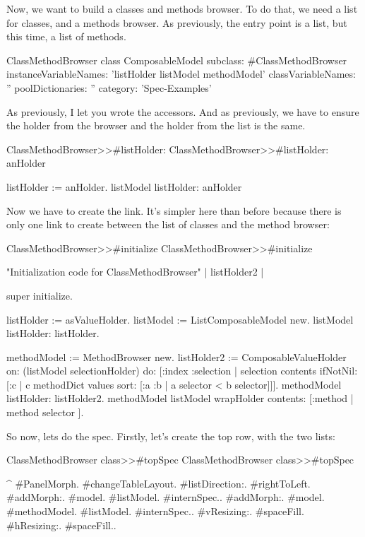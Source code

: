 \documentclass[a4paper,10pt,twoside]{book}
\begin{document}
Now, we want to build a classes and methods browser. To do that, we need a list for classes, and a methods browser. As previously, the entry point is a list, but this time, a list of methods.

\begin{classdef}{ClassMethodBrowser class}
ComposableModel subclass: #ClassMethodBrowser
	instanceVariableNames: 'listHolder listModel methodModel'
	classVariableNames: ''
	poolDictionaries: ''
	category: 'Spec-Examples'
\end{classdef}

As previously, I let you wrote the accessors. And as previously, we have to ensure the holder from the browser and the holder from the list is the same.

\begin{method}{ClassMethodBrowser>>\#listHolder:}
ClassMethodBrowser>>#listHolder: anHolder
	
	listHolder := anHolder.
	listModel listHolder: anHolder
\end{method}

Now we have to create the link. It's simpler here than before because there is only one link to create between the list of classes and the method browser:

\begin{method}{ClassMethodBrowser>>\#initialize}
ClassMethodBrowser>>#initialize

	"Initialization code for ClassMethodBrowser"
	| listHolder2 |
	
	super initialize.
	
	listHolder := {} asValueHolder.
	listModel := ListComposableModel new.
	listModel listHolder: listHolder.
	
	methodModel := MethodBrowser new.
	listHolder2 := ComposableValueHolder on: (listModel selectionHolder) do: [:index :selection | selection contents ifNotNil: [:c | c methodDict values sort: [:a :b | a selector < b selector]]].
	methodModel listHolder: listHolder2.
	methodModel listModel wrapHolder contents: [:method | method selector ].
\end{method}

So now, lets do the spec. Firstly, let's create the top row, with the two lists:
\begin{method}{ClassMethodBrowser class>>\#topSpec}
ClassMethodBrowser class>>#topSpec

	^{ #PanelMorph.
			#changeTableLayout.
			#listDirection:. #rightToLeft.
			#addMorph:. {#model. #listModel. #internSpec.}.
			#addMorph:. {#model. #methodModel. #listModel. #internSpec.}.
			#vResizing:. #spaceFill.
			#hResizing:. #spaceFill.}.
\end{method}
\end{document}
